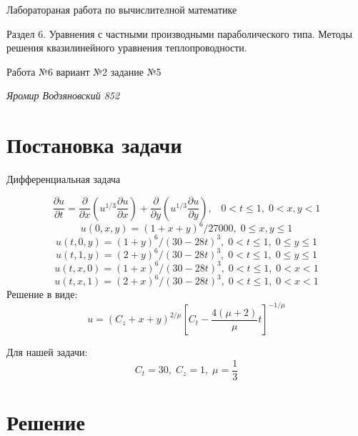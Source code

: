\documentclass[11pt]{article}
\begin{document}
    
\begin{center}   
    {\LARGE{Лаборатораная работа по вычислителной математике} }
    
    
     
        \hypertarget{ux440ux430ux437ux434ux435ux43b-4.-ux43aux440ux430ux435ux432ux44bux435-ux437ux430ux434ux430ux447ux438-ux434ux43bux44f-ux43eux434ux443-2-ux433ux43e-ux43fux43eux440ux44fux434ux43aux430.}{%
    {\Large{Раздел 6. Уравнения с частными производными параболического типа. Методы решения квазилинейного
    уравнения
    теплопроводности.}}\label{ux440ux430ux437ux434ux435ux43b-4.-ux43aux440ux430ux435ux432ux44bux435-ux437ux430ux434ux430ux447ux438-ux434ux43bux44f-ux43eux434ux443-2-ux433ux43e-ux43fux43eux440ux44fux434ux43aux430.}}
    
    \hypertarget{ux43bux430ux431ux43eux440ux430ux442ux43eux440ux43dux430ux44f-ux440ux430ux431ux43eux442ux430-4-ux432ux430ux440ux438ux430ux43dux442-3-ux437ux430ux434ux430ux43dux438ux435-1}{%
    {\large{Работа №6 вариант №2 задание
    №5}}}\label{ux43bux430ux431ux43eux440ux430ux442ux43eux440ux43ftimeux430ux44f-ux440ux430ux431ux43eux442ux430-4-ux432ux430ux440ux438ux430ux43dux442-3-ux437ux430ux434ux430ux43dux438ux435-1}
    \end{center}
    \emph{Яромир Водзяновский 852}
    
    

    
\section{Постановка задачи}
    Дифференциальная задача

\[\frac{\partial u}{\partial t} = \frac{\partial}{\partial x} \left( u^{1/3} \frac{\partial u}{\partial x} \right) + \frac{\partial}{\partial y} \left( u^{1/3} \frac{\partial u}{\partial y} \right), \;\;\; 0 < t\leq 1, \; 0 < x,y <1    \]
\[u(0,x,y) = (1+x+y)^6 / 27000, \; 0 \leq x,y \leq 1  \]
\[u(t,0,y) = (1+y)^6 / (30-28t)^3, \; 0 < t \leq 1, \; 0 \leq y \leq 1  \]
\[u(t,1,y) = (2+y)^6/(30-28t)^3, \; 0 < t \leq 1, \; 0 \leq y \leq 1   \]
\[u(t,x,0) = (1+x)^6 /(30-28t)^3, \; 0 < t \leq 1, \; 0 < x < 1    \]
\[u(t,x,1) = (2+x)^6 /(30-28t)^3, \; 0 < t \leq 1, \; 0 < x < 1    \]
Решение в виде:
\[u = (C_z + x + y)^{2/\mu} \left[ C_t - \frac{4 (\mu +2)}{\mu}t \right]^{-1/\mu} \]

Для нашей задачи: \[C_t = 30, \; C_z = 1,\; \mu = \frac{1}{3}\]

\section{Решение}
\end{document}
